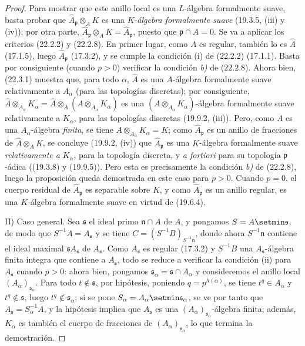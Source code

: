 \begin{proof}
Para mostrar que este anillo local es una $L$-álgebra formalmente suave, basta
probar que $\widehat A_\mathfrak p\otimes_A K$ es una $K$-\emph{álgebra formalmente
suave} (19.3.5, (iii) y (iv)); por otra parte,
$\widehat A_\mathfrak p\otimes_A K=\widehat A_\mathfrak p$, puesto que
$\mathfrak p\cap A=0$. Se va a aplicar los criterios (22.2.2) y (22.2.8).
En primer lugar, como $A$ es regular, también lo es $\widehat A$ (17.1.5),
luego $\widehat A_\mathfrak p$ (17.3.2), y se cumple la condición (i) de
(22.2.2) (17.1.1). Basta por consiguiente (cuando $p>0$) verificar la
condición \emph{b)} de (22.2.8). Ahora bien, (22.3.1) muestra que, para todo
$\alpha$, $\widehat A$ es una $A$-álgebra formalmente suave relativamente a
$A_\alpha$ (para las topologías discretas); por consiguiente,
$\widehat A\otimes_{A_\alpha}K_\alpha=\widehat A\otimes_A(A\otimes_{A_\alpha}K_\alpha)$
es una $(A\otimes_{A_\alpha}K_\alpha)$-álgebra formalmente suave relativamente
a $K_\alpha$, para las topologías discretas (19.9.2, (iii)). Pero, como $A$
es una $A_\alpha$-álgebra \emph{finita}, se tiene
$A\otimes_{A_\alpha}K_\alpha=K$; como $\widehat A_\mathfrak p$ es un anillo
de fracciones de $\widehat A\otimes_A K$, se concluye (19.9.2, (iv)) que
$\widehat A_\mathfrak p$ es una $K$-álgebra formalmente suave \emph{relativamente a}
$K_\alpha$, para la topología discreta, y \emph{a fortiori} para su topología
$\mathfrak p$-ádica ((19.3.8) y (19.9.5)). Pero esta es precisamente la
condición \emph{b)} de (22.2.8), luego la proposición queda demostrada en este caso
para $p>0$. Cuando $p=0$, el cuerpo residual de
$\widehat A_\mathfrak p$ es separable sobre $K$, y como
$\widehat A_\mathfrak p$ es un anillo regular, es una $K$-álgebra formalmente
suave en virtud de (19.6.4).

II) Caso general. Sea $\mathfrak s$ el ideal primo $\mathfrak n\cap A$ de
$A$, y pongamos $S=A\setmin\mathfrak s$, de modo que $S^{-1}A=A_\mathfrak s$ y se
tiene $C=(S^{-1}B)_{S^{-1}\mathfrak n}$, donde ahora
$S^{-1}\mathfrak n$ contiene el ideal maximal
$\mathfrak sA_\mathfrak s$ de $A_\mathfrak s$. Como $A_\mathfrak s$ es
regular (17.3.2) y $S^{-1}B$ una $A_\mathfrak s$-álgebra finita íntegra que
contiene a $A_\mathfrak s$, todo se reduce a verificar la condición (ii) para
$A_\mathfrak s$ cuando $p>0$: ahora bien, pongamos
$\mathfrak s_\alpha=\mathfrak s\cap A_\alpha$ y consideremos el anillo local
$(A_\alpha)_{\mathfrak s_\alpha}$. Para todo $t\notin\mathfrak s$, por
hipótesis, poniendo $q=p^{h(\alpha)}$, se tiene $t^q\in A_\alpha$ y
$t^q\notin\mathfrak s$, luego $t^q\notin\mathfrak s_\alpha$; si se pone
$S_\alpha=A_\alpha\setmin\mathfrak s_\alpha$, se ve por tanto que
$A_\mathfrak s=S_\alpha^{-1}A$, y la hipótesis implica que
$A_\mathfrak s$ es una $(A_\alpha)_{\mathfrak s_\alpha}$-álgebra finita;
además, $K_\alpha$ es también el cuerpo de fracciones de
$(A_\alpha)_{\mathfrak s_\alpha}$, lo que termina la demostración.
\end{proof}

